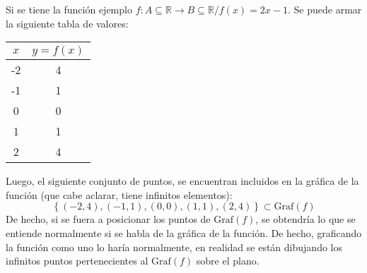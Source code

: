 \begin{example}
    Si se tiene la función ejemplo $f: A \subseteq \mathbb{R} \rightarrow B \subseteq \mathbb{R} / f(x)=2x-1$.
    Se puede armar la siguiente tabla de valores:
    \begin{table}[H]
        \centering
        \begin{tabular}{|c|c|}
            \hline
            $x$ & $y=f(x)$ \\ \hline
            -2  & 4        \\ \hline
            -1  & 1        \\ \hline
            0   & 0        \\ \hline
            1   & 1        \\ \hline
            2   & 4        \\ \hline
            \end{tabular}
      \end{table}
    Luego, el siguiente conjunto de puntos, se encuentran incluidos en la
    gráfica de la función (que cabe aclarar, tiene infinitos elementos):
    \begin{equation*}
        \left\{ (-2,4),(-1,1),(0,0),(1,1),(2,4) \right\}\subset \text{Graf}(f)
    \end{equation*}
    De hecho, si se fuera a posicionar los puntos de $\text{Graf}(f)$, se obtendría
    lo que se entiende normalmente si se habla de la gráfica de la función. De hecho,
    graficando la función como uno lo haría normalmente, en realidad
    se están dibujando los infinitos puntos pertenecientes
    al $\text{Graf}(f)$ sobre el plano.
    \begin{center}
        \end{center}
\end{example}
